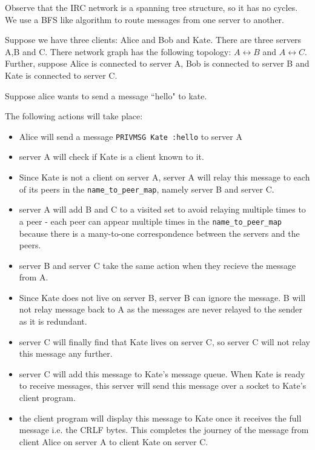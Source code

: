 \documentclass[letterpaper,twocolumn,10pt]{article}
\begin{document}
Observe that the IRC network is a spanning tree structure, so it has no cycles.
We use a BFS like algorithm to route messages from one server to another.

Suppose we have three clients: Alice and Bob and Kate. There are three servers
A,B and C. There network graph has the following topology: $A \leftrightarrow B$ and $A
	\leftrightarrow C$. Further, suppose Alice is connected to server A, Bob is connected to server B and Kate is
connected to server C.

Suppose alice wants to send a message ``hello" to kate.

The following actions will take place:

\begin{itemize}

	\item Alice will send a message \verb|PRIVMSG Kate :hello| to server A
	\item server A
	      will check if Kate is a client known to it.
	\item Since Kate is not a client on server
	      A, server A will relay this message to each of its peers in the
	      \verb|name_to_peer_map|, namely server B and server C.
	\item server A will add B
	      and C to a visited set to avoid relaying multiple times to a peer -
	      each peer can appear multiple times in the \verb|name_to_peer_map| because
	      there is a many-to-one correspondence between the servers and the peers.
	\item server B and server C take the same action when they recieve the message from A.
	\item Since Kate does not live on server B, server B
	      can ignore the message. B will not relay message back to A as
	      the messages are never relayed to the sender as it is redundant.
	\item server C will finally find that Kate lives on server C, so server C
	      will not relay this message any further.
	\item server C will add this message to Kate's message queue. When Kate is
	      ready to receive messages,
	      this server will send this message over a socket to Kate's client
	      program.
	\item the client program will display this message to Kate once it receives the
	      full message i.e. the CRLF bytes. This completes the journey of the message from client Alice
	      on server A to client Kate on server C.

\end{itemize}
\end{document}
